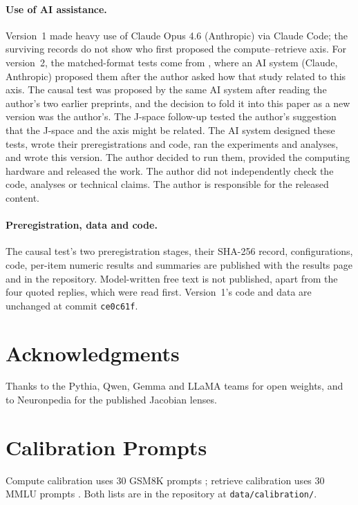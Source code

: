 \documentclass[11pt]{article}
\begin{document}
\paragraph{Use of AI assistance.} Version~1 made heavy use of Claude Opus 4.6 (Anthropic) via Claude Code; the surviving records do not show who first proposed the compute--retrieve axis. For version~2, the matched-format tests come from \citet{ramdan2026fingerprint}, where an AI system (Claude, Anthropic) proposed them after the author asked how that study related to this axis. The causal test was proposed by the same AI system after reading the author's two earlier preprints, and the decision to fold it into this paper as a new version was the author's. The J-space follow-up tested the author's suggestion that the J-space and the axis might be related. The AI system designed these tests, wrote their preregistrations and code, ran the experiments and analyses, and wrote this version. The author decided to run them, provided the computing hardware and released the work. The author did not independently check the code, analyses or technical claims. The author is responsible for the released content.

\paragraph{Preregistration, data and code.} The causal test's two preregistration stages, their SHA-256 record, configurations, code, per-item numeric results and summaries are published with the results page and in the repository. Model-written free text is not published, apart from the four quoted replies, which were read first. Version~1's code and data are unchanged at commit \texttt{ce0c61f}.

\section*{Acknowledgments}
Thanks to the Pythia, Qwen, Gemma and LLaMA teams for open weights, and to Neuronpedia for the published Jacobian lenses.




\appendix

\section{Calibration Prompts}\label{app:prompts}
Compute calibration uses 30 GSM8K prompts \citep{cobbe2021gsm8k}; retrieve calibration uses 30 MMLU prompts \citep{hendrycks2021mmlu}. Both lists are in the repository at \texttt{data/calibration/}.
\end{document}
